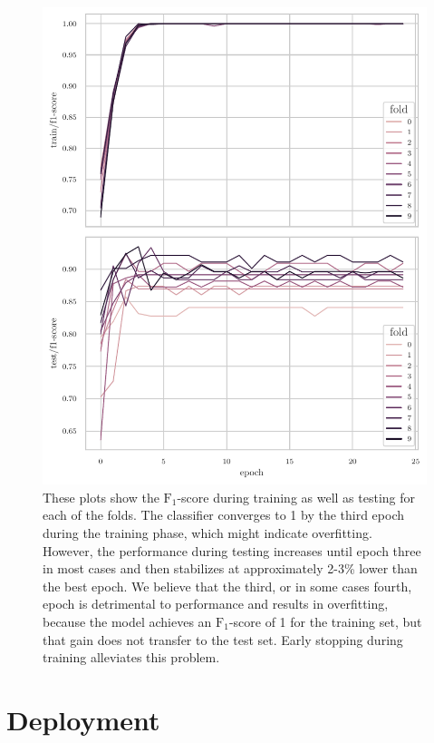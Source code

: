 \documentclass[draft,final]{vutinfth} %
\begin{document}
\begin{figure}
  \centering
  \includegraphics[width=.9\textwidth]{graphics/classifier-hyp-folds-f1.pdf}
  \caption[$\mathrm{F}_1$-score of stratified $10$-fold cross
  validation.]{These plots show the $\mathrm{F}_1$-score during
    training as well as testing for each of the folds. The classifier
    converges to 1 by the third epoch during the training phase, which
    might indicate overfitting. However, the performance during
    testing increases until epoch three in most cases and then
    stabilizes at approximately 2-3\% lower than the best epoch. We
    believe that the third, or in some cases fourth, epoch is
    detrimental to performance and results in overfitting, because the
    model achieves an $\mathrm{F}_1$-score of 1 for the training set,
    but that gain does not transfer to the test set. Early stopping
    during training alleviates this problem.}
  \label{fig:classifier-hyp-folds}
\end{figure}

\section{Deployment}
\end{document}
